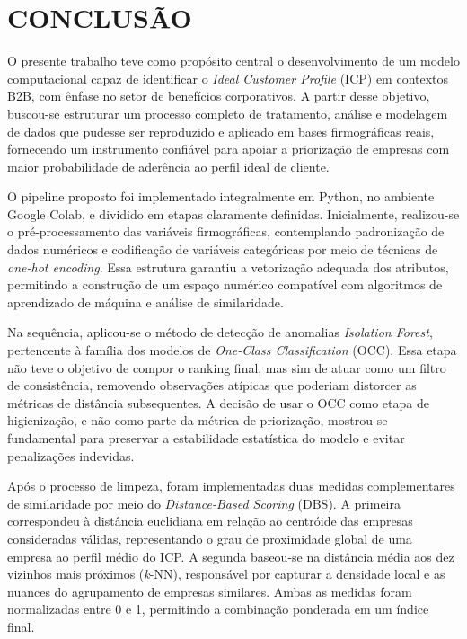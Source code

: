 \chapter{CONCLUSÃO}
\label{chap:conclusao}

O presente trabalho teve como propósito central o desenvolvimento de um modelo computacional capaz de identificar o \textit{Ideal Customer Profile} (ICP) em contextos B2B, com ênfase no setor de benefícios corporativos. A partir desse objetivo, buscou-se estruturar um processo completo de tratamento, análise e modelagem de dados que pudesse ser reproduzido e aplicado em bases firmográficas reais, fornecendo um instrumento confiável para apoiar a priorização de empresas com maior probabilidade de aderência ao perfil ideal de cliente.

O pipeline proposto foi implementado integralmente em Python, no ambiente Google Colab, e dividido em etapas claramente definidas. Inicialmente, realizou-se o pré-processamento das variáveis firmográficas, contemplando padronização de dados numéricos e codificação de variáveis categóricas por meio de técnicas de \textit{one-hot encoding}. Essa estrutura garantiu a vetorização adequada dos atributos, permitindo a construção de um espaço numérico compatível com algoritmos de aprendizado de máquina e análise de similaridade.

Na sequência, aplicou-se o método de detecção de anomalias \textit{Isolation Forest}, pertencente à família dos modelos de \textit{One-Class Classification} (OCC). Essa etapa não teve o objetivo de compor o ranking final, mas sim de atuar como um filtro de consistência, removendo observações atípicas que poderiam distorcer as métricas de distância subsequentes. A decisão de usar o OCC como etapa de higienização, e não como parte da métrica de priorização, mostrou-se fundamental para preservar a estabilidade estatística do modelo e evitar penalizações indevidas.

Após o processo de limpeza, foram implementadas duas medidas complementares de similaridade por meio do \textit{Distance-Based Scoring} (DBS). A primeira correspondeu à distância euclidiana em relação ao centróide das empresas consideradas válidas, representando o grau de proximidade global de uma empresa ao perfil médio do ICP. A segunda baseou-se na distância média aos dez vizinhos mais próximos (\textit{k}-NN), responsável por capturar a densidade local e as nuances do agrupamento de empresas similares. Ambas as medidas foram normalizadas entre 0 e 1, permitindo a combinação ponderada em um índice final.


